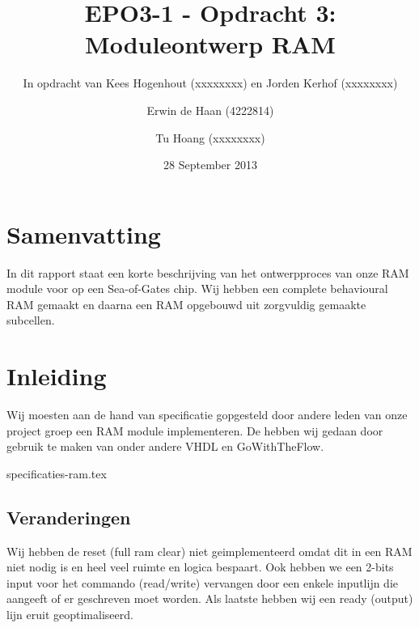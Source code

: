 \documentclass{scrartcl}  %
\author{Erwin {de Haan} (4222814) \and {Tu Hoang} (xxxxxxxx)}
\title{EPO3-1 - Opdracht 3: Moduleontwerp RAM}
\subtitle{In opdracht van Kees Hogenhout (xxxxxxxx) en Jorden Kerhof (xxxxxxxx)}
\date{28 September 2013}
\begin{document}
\maketitle
{}
\section*{Samenvatting}
In dit rapport staat een korte beschrijving van het ontwerpproces van onze RAM module voor op een Sea-of-Gates chip.
Wij hebben een complete behavioural RAM gemaakt en daarna een RAM opgebouwd uit zorgvuldig gemaakte subcellen.
\newpage
\setlength{\cftbeforetoctitleskip}{-3em}
\tableofcontents

\section{Inleiding}
Wij moesten aan de hand van specificatie gopgesteld door andere leden van onze project groep een RAM module implementeren.
De hebben wij gedaan door gebruik te maken van onder andere VHDL en GoWithTheFlow. \nocite{epo3-manual}

\newpage
{}

{specificaties-ram.tex}

\subsection{Veranderingen}
Wij hebben de reset (full ram clear) niet geimplementeerd omdat dit in een RAM niet nodig is en heel veel ruimte en logica bespaart.
Ook hebben we een 2-bits input voor het commando (read/write) vervangen door een enkele inputlijn die aangeeft of er geschreven moet worden.
Als laatste hebben wij een ready (output) lijn eruit geoptimaliseerd.
\end{document}
